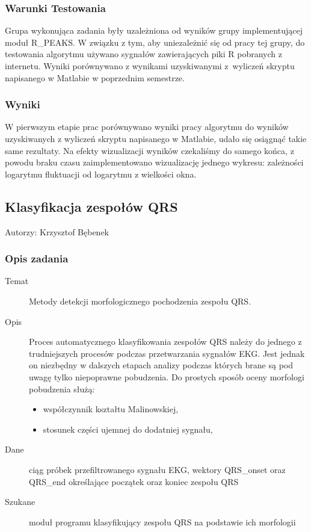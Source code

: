 \documentclass[a4paper, 11pt]{article}
\begin{document}
\subsubsection{Warunki Testowania}
\label{sec:dfa:tests}

Grupa wykonująca zadania były uzależniona od wyników grupy implementującej moduł R\_PEAKS. W związku z tym, aby uniezależnić się od pracy tej grupy, do testowania algorytmu używano sygnałów zawierających piki R pobranych z internetu. Wyniki porównywano z wynikami uzyskiwanymi z~wyliczeń skryptu napisanego w Matlabie w poprzednim semestrze.

\subsubsection{Wyniki}
\label{sec:dfa:results}

W pierwszym etapie prac porównywano wyniki pracy algorytmu do wyników uzyskiwanych z wyliczeń skryptu napisanego w Matlabie, udało się osiągnąć takie same rezultaty. Na efekty wizualizacji wyników czekaliśmy do samego końca, z powodu braku czasu zaimplementowano wizualizację jednego wykresu: zależności logarytmu fluktuacji od logarytmu z wielkości okna.

\subsection{Klasyfikacja zespołów QRS}
\label{sec:qrs_class}
Autorzy: Krzysztof Bębenek

\subsubsection{Opis zadania}
\label{sec:qrs_class:desc}

\begin{description}
\item[Temat] Metody detekcji morfologicznego pochodzenia zespołu QRS.
\item[Opis] Proces automatycznego klasyfikowania zespołów QRS należy do jednego z trudniejszych procesów podczas przetwarzania sygnałów EKG. Jest jednak on niezbędny w dalszych etapach analizy podczas których brane są pod uwagę tylko niepoprawne pobudzenia. Do prostych sposób oceny morfologi pobudzenia służą:
  \begin{itemize}
  \item współczynnik kształtu Malinowskiej,
  \item stosunek części ujemnej do dodatniej sygnału,
  \end{itemize}
\item[Dane] ciąg próbek przefiltrowanego sygnału EKG, wektory QRS\_onset oraz QRS\_end określające początek oraz koniec zespołu QRS
\item[Szukane] moduł programu klasyfikujący zespołu QRS na podstawie ich morfologii 
\end{description}
\end{document}
